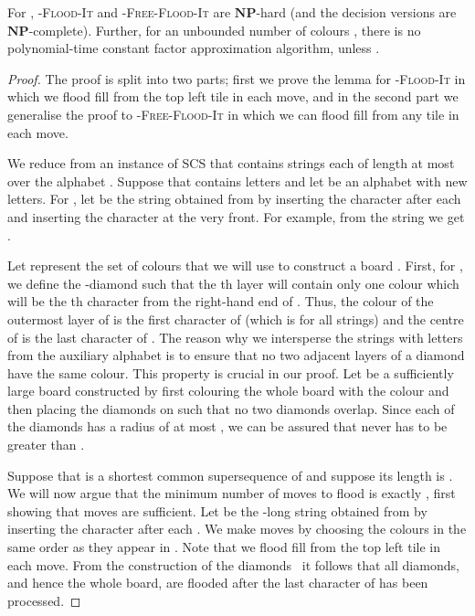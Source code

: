\documentclass[a4paper,11pt]{llncs}
\newcounter{l}
\newcommand{\NPtime}{\ensuremath{\mathbf{NP}}}
\newcommand{\Coloroid}[1]{-\textsc{Flood-It}}
\newcommand{\ColoroidFree}[1]{-\textsc{Free-Flood-It}}
\newcommand{\SCS}{\textsc{SCS}}
\newcommand{\recdim}[2]{}
\begin{document}
\begin{lemma}
    \label{lem:NPC-four}
    For , \Coloroid{c} and \ColoroidFree{c} are \NPtime-hard (and the decision versions are \NPtime-complete). Further, for an unbounded number of colours , there is no polynomial-time constant factor approximation algorithm, unless .
\end{lemma}
\begin{proof}
    The proof is split into two parts; first we prove the lemma for \Coloroid{c} in which we flood fill from the top left tile in each move, and in the second part we generalise the proof to \ColoroidFree{c} in which we can flood fill from any tile in each move.

    We reduce from an instance of \SCS{} that contains  strings  each of length at most  over the alphabet . Suppose that  contains  letters and let  be an alphabet with  new letters. For , let  be the string obtained from  by inserting the character  after each  and inserting the character  at the very front. For example, from the string  we get .

    Let  represent the set of  colours that we will use to construct a board . First, for , we define the -diamond  such that the th layer will contain only one colour which will be the th character from the right-hand end of . Thus, the colour of the outermost layer of  is the first character of  (which is  for all strings) and the centre of  is the last character of . The reason why we intersperse the strings with letters from the auxiliary alphabet  is to ensure that no two adjacent layers of a diamond have the same colour. This property is crucial in our proof. Let  be a sufficiently large \recdim{n}{n} board constructed by first colouring the whole board with the colour  and then placing the  diamonds  on  such that no two diamonds overlap. Since each of the  diamonds has a radius of at most , we can be assured that  never has to be greater than .

    Suppose that  is a shortest common supersequence of  and suppose its length is . We will now argue that the minimum number of moves to flood  is exactly , first showing that  moves are sufficient. Let  be the -long string obtained from  by inserting the character  after each . We make  moves by choosing the colours in the same order as they appear in . Note that we flood fill from the top left tile in each move. From the construction of the diamonds~ it follows that all diamonds, and hence the whole board, are flooded after the last character of  has been processed.


\end{proof}
\end{document}
